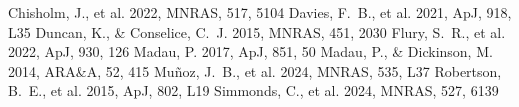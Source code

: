 \documentclass[twocolumn]{aastex631}
\begin{document}
\begin{thebibliography}{}
 Chisholm, J., et al. 2022, MNRAS, 517, 5104
 Davies, F.~B., et al. 2021, ApJ, 918, L35
 Duncan, K., \& Conselice, C.~J. 2015, MNRAS, 451, 2030
 Flury, S.~R., et al. 2022, ApJ, 930, 126
 Madau, P. 2017, ApJ, 851, 50
 Madau, P., \& Dickinson, M. 2014, ARA\&A, 52, 415
 Mu\~noz, J.~B., et al. 2024, MNRAS, 535, L37
 Robertson, B.~E., et al. 2015, ApJ, 802, L19
 Simmonds, C., et al. 2024, MNRAS, 527, 6139
\end{thebibliography}
\end{document}
